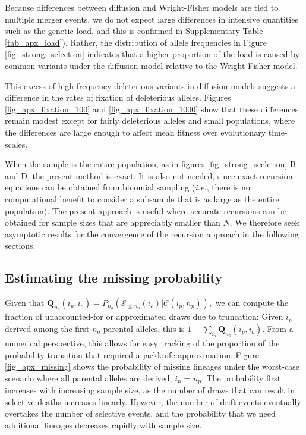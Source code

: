 \documentclass[review,nonatbib]{elsarticle}
\begin{document}
Because differences between diffusion and Wright-Fisher models are tied to multiple merger events, 
we do not expect large differences in intensive quantities such as the genetic load, and this is confirmed
in Supplementary Table \ref{tab_apx_load}). 
Rather, the distribution of allele frequencies in Figure \ref{fig_strong_selection}
 indicates that a higher proportion of the load is caused by common variants  
 under the diffusion model relative to the Wright-Fisher model. 

This excess of high-frequency deleterious variants in diffusion models suggests a difference 
in the rates of fixation of deleterious alleles. 
Figures \ref{fig_apx_fixation_100} and \ref{fig_apx_fixation_1000} show that these differences 
remain modest except for fairly deleterious alleles and small populations,
where the differences are large enough to affect mean fitness over evolutionary time-scales. 


When the sample is the entire population, as in figures \ref{fig_strong_seelction} B and D, the
present method is exact. It is also not needed, since exact recursion equations can be obtained 
from binomial sampling (\textit{i.e.}, there is no computational benefit to consider a subsample that is as
large as the entire population).  The present approach is useful where accurate recursions can be
obtained for sample sizes that are appreciably smaller than $N$. We therefore seek asymptotic
results for the convergence of the recursion approach in the following sections.

\subsection{Estimating the missing probability}
\label{subsec_missing}


Given that $ \mathbf{Q}_{n_o}(i_p, i_o) = P_{n_o}(\mathcal{S}_{\leq n_o} (i_o)|
\mathcal{C}(i_p,n_p)),$ we can compute the fraction of unaccounted-for or approximated draws 
due to truncation:
Given $i_p$ derived among the first $n_o$ parental alleles, this is $1-\sum_{i_o} \mathbf{Q}_{n_o}(i_p,
i_o).$ From a numerical perspective, this allows for easy tracking of the proportion of the probability
transition that required a jackknife approximation. 
Figure \ref{fig_apx_missing} shows the probability of missing lineages under the worst-case
scenario where all parental alleles are derived, $i_p$ = $n_p.$ 
The probability first increases with increasing sample size, as the number of draws that
can result in selective deaths increases linearly. However, the number of drift events eventually overtakes
the number of selective events, and the probability that we need additional lineages decreases
rapidly with sample size. 
\end{document}
